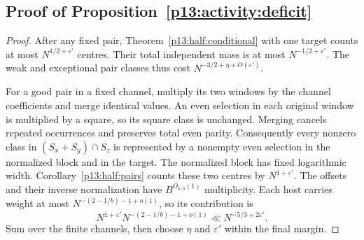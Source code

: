 \subsection{Proof of Proposition~\ref{p13:activity:deficit}}
\label{p14:comp:activity:deficit}

\begin{proof}
After any fixed pair, Theorem~\ref{p13:half:conditional}
with one target counts at most \(N^{1/2+\varepsilon'}\)
centres. Their total independent mass is at most
\(N^{-1/2+\varepsilon'}\).
The weak and exceptional pair classes thus cost
\(N^{-3/2+\eta+O(\varepsilon')}\).

For a good pair in a fixed channel, multiply its two
windows by the channel coefficients and merge identical
values. An even selection in each original window is
multiplied by a square, so its square class is unchanged.
Merging cancels repeated occurrences and preserves total
even parity. Consequently every nonzero class in
\((S_x+S_y)\cap S_z\) is represented by a nonempty even
selection in the normalized block and in the target.
The normalized block has fixed logarithmic width.
Corollary~\ref{p13:half:pairs} counts these two centres
by \(N^{1+\varepsilon'}\).
The offsets and their inverse normalization have
\(B^{O_{a,b}(1)}\) multiplicity. Each host carries weight
at most \(N^{-(2-1/b)-1+o(1)}\), so its contribution is
\[
 N^{1+\varepsilon'}N^{-(2-1/b)-1+o(1)}
 \ll N^{-5/3+2\varepsilon'}.
\]
Sum over the finite channels, then choose \(\eta\) and
\(\varepsilon'\) within the final margin.
\end{proof}
